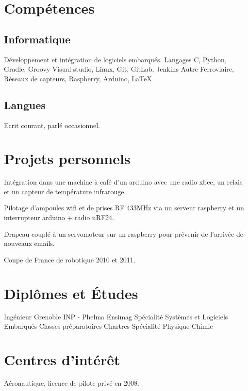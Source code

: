 \documentclass[10pt,a4paper]{moderncv}
\begin{document}
\section{Compétences}

  \subsection{Informatique}

    {\small Développement et intégration de logiciels embarqués.\newline{}}
    {Langages}
    {\small C, Python, Gradle, Groovy}
    {\small Visual studio, Linux, Git, GitLab, Jenkins\newline{}}
    {Autre}
    {\small Ferroviaire, Réseaux de capteurs, Raspberry, Arduino, \LaTeX} 

  \subsection{Langues}

    {\small Ecrit courant, parlé occasionnel.\newline{}}

\section{Projets personnels}
  {\small Intégration dans une machine à café d'un arduino avec une radio xbee, un relais et un capteur de température infrarouge.}
  
  {\small Pilotage d'ampoules wifi et de prises RF 433MHz via un serveur raspberry et un interrupteur arduino + radio nRF24.}
  
  {\small Drapeau couplé à un servomoteur sur un raspberry pour prévenir de l'arrivée de nouveaux emails.\newline{}}
  
  {\small Coupe de France de robotique 2010 et 2011.}

\section{Diplômes et Études}
  {Ingénieur Grenoble INP - Phelma Ensimag}
  {}
  {}
  {}
  {Spécialité Systèmes et Logiciels Embarqués\newline{}}
  {Classes préparatoires}
  {}
  {}
  {Chartres}
  {Spécialité Physique Chimie\newline{}}

\section{Centres d'intérêt}
  {\small Aéronautique, licence de pilote privé en 2008.}
  
\end{document}
